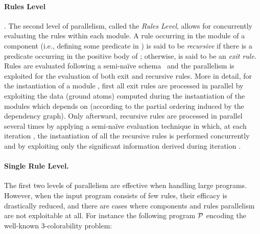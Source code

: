 \documentclass[preprint]{tlp}
\newcommand{\nop}[1]{}
\newcommand{\p}{\ensuremath{{\cal P}}\xspace}
\begin{document}
\paragraph{Rules Level}\cite{cali-etal-2008-joacil}.
The second level of parallelism, called the {\em Rules Level},
allows for concurrently evaluating the rules within each module. A
rule  occurring in the module of a component  (i.e.,
defining some predicate in ) is said to be {\em recursive} if
there is a predicate  occurring in the positive body of
; otherwise,  is said to be an {\em exit rule}. Rules are
evaluated following a semi-na\"ive schema~\cite{ullm-89} and the
parallelism is exploited for the evaluation of both exit and
recursive rules.
More in detail, for the instantiation of a module , first all
exit rules are processed in parallel by exploiting the data (ground
atoms) computed during the instantiation of the modules which 
depends on (according to the partial ordering induced by the
dependency graph).
Only afterward, recursive rules are processed in parallel several
times by applying a semi-na\"ive evaluation technique in which, at
each iteration , the instantiation of all the recursive rules is
performed concurrently and by exploiting only the significant
information derived during iteration .
\nop{ This is done by
partitioning significant atoms into three sets: ,  and
.  is filled with atoms computed during current iteration
(say );  contains atoms computed during previous
iteration (say ); and,  contains the ones previously
computed (up to iteration ).

Initially,  and  are empty; while  contains all the
information previously derived in the instantiation process. At the
beginning of each new iteration,  is assigned to ,
i.e. the new information derived during iteration  is considered
as significant information for iteration . Then, the recursive
rules are processed simultaneously and each of them uses the
information contained in the set ; at the end of the
iteration, when the evaluation of all rules is terminated, the set
 is added to the set  (since it has already been
exploited).  The evaluation stops whenever no new information has
been derived (i.e. ).
}
\paragraph{Single Rule Level.}\label{sec:rew}
The first two levels of parallelism are effective when handling large programs.
However, when the input program consists of few rules, their efficacy is drastically reduced, and
there are cases where components and rules parallelism are not
exploitable at all. For instance the following program \p encoding the
well-known 3-colorability problem:
\end{document}
